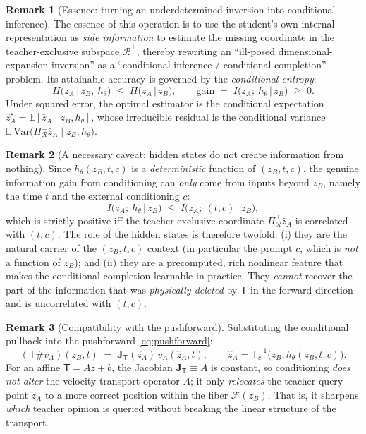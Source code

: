 \documentclass[11pt,a4paper]{article}
\newcommand{\E}{\mathbb{E}}
\newcommand{\Tmap}{\mathsf{T}}
\newcommand{\Tinv}{\mathsf{T}^{-1}}
\newcommand{\push}{\#}
\newcommand{\Jac}{\mathbf{J}}
\theoremstyle{definition}
\newtheorem{remark}{Remark}
\begin{document}
\begin{remark}[Essence: turning an underdetermined inversion into conditional inference]
\label{rem:essence}
The essence of this operation is to use the student's own internal representation as
\emph{side information} to estimate the missing coordinate in the teacher-exclusive subspace
$\mathcal{R}^{\perp}$, thereby rewriting an ``ill-posed dimensional-expansion inversion'' as a
``conditional inference / conditional completion'' problem. Its attainable accuracy is governed
by the \emph{conditional entropy}:
\begin{equation}
H\big(\bar z_A \,\big|\, z_B,\ h_\theta\big)
\;\le\;
H\big(\bar z_A \,\big|\, z_B\big),
\qquad
\text{gain}\;=\;I\big(\bar z_A;\ h_\theta \,\big|\, z_B\big)\;\ge\;0 .
\label{eq:cond-entropy}
\end{equation}
Under squared error, the optimal estimator is the conditional expectation
$\hat z_A^{\star}=\E[\bar z_A\mid z_B,h_\theta]$, whose irreducible residual is the conditional
variance $\E\,\mathrm{Var}\big(\Pi^{\perp}_{\mathcal R}\bar z_A\mid z_B,h_\theta\big)$.
\end{remark}

\begin{remark}[A necessary caveat: hidden states do not create information from nothing]
\label{rem:determinism}
Since $h_\theta(z_B,t,c)$ is a \emph{deterministic} function of $(z_B,t,c)$, the genuine
information gain from conditioning can \emph{only} come from inputs beyond $z_B$, namely the time
$t$ and the external conditioning $c$:
\[
I\big(\bar z_A;\ h_\theta \,\big|\, z_B\big)
\;\le\;
I\big(\bar z_A;\ (t,c)\,\big|\, z_B\big),
\]
which is strictly positive iff the teacher-exclusive coordinate
$\Pi^{\perp}_{\mathcal R}\bar z_A$ is correlated with $(t,c)$. The role of the hidden states is
therefore twofold: (i) they are the natural carrier of the $(z_B,t,c)$ context (in particular the
prompt $c$, which is \emph{not} a function of $z_B$); and (ii) they are a precomputed, rich
nonlinear feature that makes the conditional completion learnable in practice. They \emph{cannot}
recover the part of the information that was \emph{physically deleted} by $\Tmap$ in the forward
direction and is uncorrelated with $(t,c)$.
\end{remark}

\begin{remark}[Compatibility with the pushforward]
\label{rem:compat}
Substituting the conditional pullback into the pushforward \eqref{eq:pushforward}:
\[
(\Tmap\push v_A)(z_B,t)
\;=\;\Jac_{\Tmap}(\hat z_A)\,v_A(\hat z_A,t),
\qquad \hat z_A=\Tinv_{c}\big(z_B,h_\theta(z_B,t,c)\big).
\]
For an affine $\Tmap=Az+b$, the Jacobian $\Jac_{\Tmap}\equiv A$ is constant, so conditioning
\emph{does not alter} the velocity-transport operator $A$; it only \emph{relocates} the teacher
query point $\hat z_A$ to a more correct position within the fiber $\mathcal{F}(z_B)$. That is, it
sharpens \emph{which} teacher opinion is queried without breaking the linear structure of the
transport.
\end{remark}
\end{document}
